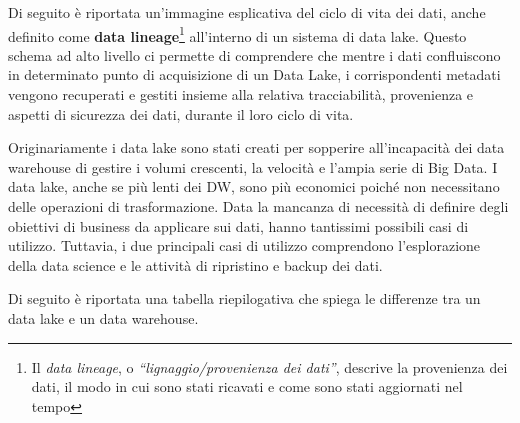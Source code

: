 Di seguito è riportata un'immagine esplicativa del ciclo di vita dei dati, anche definito come \textbf{data lineage}\footnote{Il \textit{data lineage}, o \textit{“lignaggio/provenienza dei dati”}, descrive la provenienza dei dati, il modo in cui sono stati ricavati e come sono stati aggiornati nel tempo} all'interno di un sistema di data lake. Questo schema ad alto livello ci permette di comprendere che mentre i dati confluiscono in determinato punto di acquisizione di un Data Lake, i corrispondenti metadati vengono recuperati e gestiti insieme alla relativa tracciabilità, provenienza e aspetti di sicurezza dei dati, durante il loro ciclo di vita.\cite{data_lake_for_enterprices}

Originariamente i data lake sono stati creati per sopperire all'incapacità dei data warehouse di gestire i volumi crescenti, la velocità e l'ampia serie di Big Data. I data lake, anche se più lenti dei DW, sono più economici poiché non necessitano delle operazioni di trasformazione. Data la mancanza di necessità di definire degli obiettivi di business da applicare sui dati, hanno tantissimi possibili casi di utilizzo. Tuttavia, i due principali casi di utilizzo comprendono l'esplorazione della data science e le attività di ripristino e backup dei dati.\cite{ibm_data_architecture}

Di seguito è riportata una tabella riepilogativa che spiega le differenze tra un data lake e un data warehouse.\cite{aws_data_lake_vs_data_warehouse}

